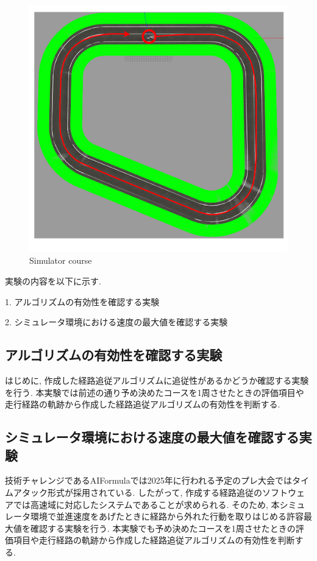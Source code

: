 \begin{figure}[H]
  \centering
 \includegraphics[keepaspectratio, scale=0.6]
      {images/simulatorpath.png}
 \caption{Simulator course}
 \label{fig:simulator}
\end{figure}

実験の内容を以下に示す.

\vspace{10mm}

1. アルゴリズムの有効性を確認する実験

2. シミュレータ環境における速度の最大値を確認する実験

\subsection{アルゴリズムの有効性を確認する実験}
はじめに, 作成した経路追従アルゴリズムに追従性があるかどうか確認する実験を行う.
本実験では前述の通り予め決めたコースを1周させたときの評価項目や走行経路の軌跡から作成した経路追従アルゴリズムの有効性を判断する.

\subsection{シミュレータ環境における速度の最大値を確認する実験}
技術チャレンジであるAIFormulaでは2025年に行われる予定のプレ大会ではタイムアタック形式が採用されている.
したがって, 作成する経路追従のソフトウェアでは高速域に対応したシステムであることが求められる.
そのため, 本シミュレータ環境で並進速度をあげたときに経路から外れた行動を取りはじめる許容最大値を確認する実験を行う.
本実験でも予め決めたコースを1周させたときの評価項目や走行経路の軌跡から作成した経路追従アルゴリズムの有効性を判断する.


